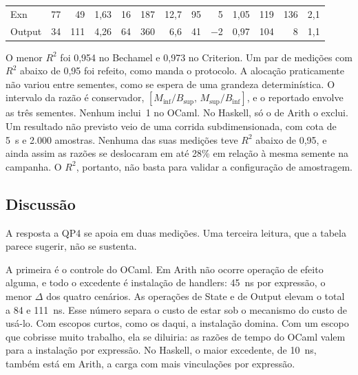 \documentclass[12pt]{article}
\newcommand{\BaseByHaskellExn}{119}
\newcommand{\BaseByHaskellOutput}{104}
\newcommand{\BaseByOcamlExn}{16}
\newcommand{\BaseByOcamlOutput}{64}
\newcommand{\BaseNsHaskellExn}{95}
\newcommand{\BaseNsHaskellOutput}{41}
\newcommand{\BaseNsOcamlExn}{77}
\newcommand{\BaseNsOcamlOutput}{34}
\newcommand{\DeltaByHaskellExn}{136}
\newcommand{\DeltaByHaskellOutput}{8}
\newcommand{\DeltaByOcamlExn}{187}
\newcommand{\DeltaByOcamlOutput}{360}
\newcommand{\DeltaNsHaskellArith}{10}
\newcommand{\DeltaNsHaskellExn}{5}
\newcommand{\DeltaNsHaskellOutput}{$-$2}
\newcommand{\DeltaNsOcamlArith}{45}
\newcommand{\DeltaNsOcamlExn}{49}
\newcommand{\DeltaNsOcamlOutput}{111}
\newcommand{\DeltaNsOcamlState}{84}
\newcommand{\FraseRepeticoes}{Um par de medições com $R^2$ abaixo de 0,95 foi refeito, como manda o protocolo.}
\newcommand{\RAHaskellExn}{2,1}
\newcommand{\RAHaskellOutput}{1,1}
\newcommand{\RAOcamlExn}{12,7}
\newcommand{\RAOcamlOutput}{6,6}
\newcommand{\RTHaskellExn}{1,05}
\newcommand{\RTHaskellOutput}{0,97}
\newcommand{\RTOcamlExn}{1,63}
\newcommand{\RTOcamlOutput}{4,26}
\newcommand{\RdoisMinHaskell}{0,973}
\newcommand{\RdoisMinOcaml}{0,954}
\newcommand{\SensCotaS}{5}
\newcommand{\SensDifRazaoMax}{28}
\newcommand{\SensLimite}{2.000}
\begin{document}
\begin{table}[ht]
\begin{tabular}{@{}l*{12}{r}@{}}
    Exn              & \BaseNsOcamlExn & \DeltaNsOcamlExn & \RTOcamlExn & \BaseByOcamlExn & \DeltaByOcamlExn & \RAOcamlExn & \BaseNsHaskellExn & \DeltaNsHaskellExn & \RTHaskellExn & \BaseByHaskellExn & \DeltaByHaskellExn & \RAHaskellExn \\
    Output           & \BaseNsOcamlOutput & \DeltaNsOcamlOutput & \RTOcamlOutput & \BaseByOcamlOutput & \DeltaByOcamlOutput & \RAOcamlOutput & \BaseNsHaskellOutput & \DeltaNsHaskellOutput & \RTHaskellOutput & \BaseByHaskellOutput & \DeltaByHaskellOutput & \RAHaskellOutput \\
    \bottomrule
  \end{tabular}
\end{table}

O menor $R^2$ foi \RdoisMinOcaml{} no Bechamel e \RdoisMinHaskell{} no
Criterion. \FraseRepeticoes{} A alocação praticamente não variou entre
sementes, como se espera de uma grandeza determinística. O intervalo da razão
é conservador, $[M_{\inf}/B_{\sup},\, M_{\sup}/B_{\inf}]$, e o reportado
envolve as três sementes. Nenhum inclui~1 no OCaml. %
No Haskell, só o de Arith o exclui. %
Um resultado não previsto veio de uma corrida subdimensionada, com cota de
\SensCotaS{}~s e \SensLimite{} amostras. Nenhuma das suas medições teve $R^2$
abaixo de 0,95, %
e ainda assim as razões se deslocaram em até \SensDifRazaoMax\% em relação à
mesma semente na campanha. %
O $R^2$, portanto, não basta para validar a configuração de amostragem.

\subsection{Discussão}\label{sec:discussao}

A resposta a QP4 se apoia em duas medições. Uma terceira leitura, que a
tabela parece sugerir, não se sustenta.

A primeira é o controle do OCaml. Em Arith não ocorre operação de
efeito alguma, e todo o excedente é instalação de handlers:
\DeltaNsOcamlArith{}~ns por expressão, o menor $\Delta$ dos quatro
cenários. %
As operações de State e de Output elevam o total a
\DeltaNsOcamlState{} e \DeltaNsOcamlOutput{}~ns. Esse número separa o custo
de estar sob o mecanismo do custo de usá-lo. Com escopos curtos, como
os daqui, a instalação domina. Com um escopo que cobrisse muito trabalho, ela
se diluiria: as razões de tempo do OCaml valem para a instalação por expressão. No Haskell, o maior excedente, de
\DeltaNsHaskellArith{}~ns, também está em Arith, %
a carga com mais vinculações por expressão.
\end{document}
